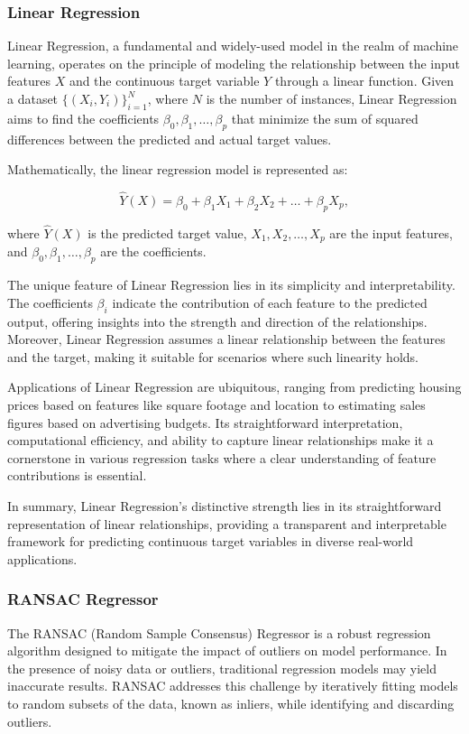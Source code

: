 \documentclass[twocolumn]{article}
\begin{document}
		\subsubsection{Linear Regression}
Linear Regression, a fundamental and widely-used model in the realm of machine learning, operates on the principle of modeling the relationship between the input features \(X\) and the continuous target variable \(Y\) through a linear function. Given a dataset \(\{(X_i, Y_i)\}_{i=1}^{N}\), where \(N\) is the number of instances, Linear Regression aims to find the coefficients \(\beta_0, \beta_1, \ldots, \beta_p\) that minimize the sum of squared differences between the predicted and actual target values.

Mathematically, the linear regression model is represented as:

\[ \hat{Y}(X) = \beta_0 + \beta_1 X_1 + \beta_2 X_2 + \ldots + \beta_p X_p, \]

where \(\hat{Y}(X)\) is the predicted target value, \(X_1, X_2, \ldots, X_p\) are the input features, and \(\beta_0, \beta_1, \ldots, \beta_p\) are the coefficients.

The unique feature of Linear Regression lies in its simplicity and interpretability. The coefficients \(\beta_i\) indicate the contribution of each feature to the predicted output, offering insights into the strength and direction of the relationships. Moreover, Linear Regression assumes a linear relationship between the features and the target, making it suitable for scenarios where such linearity holds.

Applications of Linear Regression are ubiquitous, ranging from predicting housing prices based on features like square footage and location to estimating sales figures based on advertising budgets. Its straightforward interpretation, computational efficiency, and ability to capture linear relationships make it a cornerstone in various regression tasks where a clear understanding of feature contributions is essential.

In summary, Linear Regression's distinctive strength lies in its straightforward representation of linear relationships, providing a transparent and interpretable framework for predicting continuous target variables in diverse real-world applications.

		\subsubsection{RANSAC Regressor}
The RANSAC (Random Sample Consensus) Regressor is a robust regression algorithm designed to mitigate the impact of outliers on model performance. In the presence of noisy data or outliers, traditional regression models may yield inaccurate results. RANSAC addresses this challenge by iteratively fitting models to random subsets of the data, known as inliers, while identifying and discarding outliers.
\end{document}
